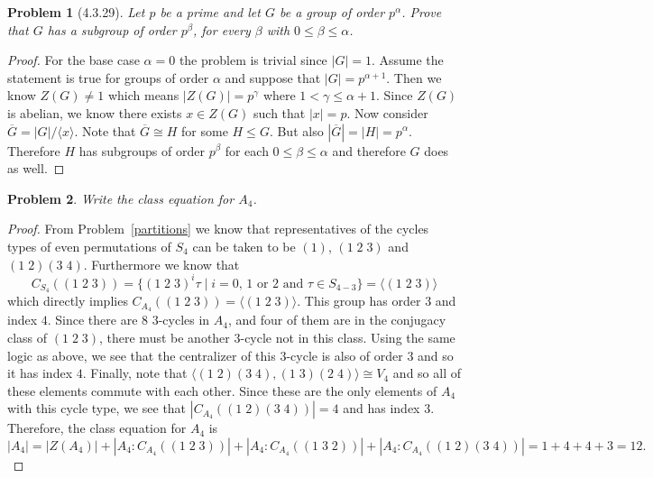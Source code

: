 \documentclass{article}
\newtheorem{problem}{Problem}
\begin{document}
\begin{problem}[4.3.29]
Let $p$ be a prime and let $G$ be a group of order $p^{\alpha}$. Prove that $G$ has a subgroup of order $p^{\beta}$, for every $\beta$ with $0 \leq \beta \leq \alpha$.
\end{problem}
\begin{proof}
For the base case $\alpha = 0$ the problem is trivial since $|G| = 1$. Assume the statement is true for groups of order $\alpha$ and suppose that $|G| = p^{\alpha + 1}$. Then we know $Z(G) \neq 1$ which means $|Z(G)| = p^{\gamma}$ where $1 < \gamma \leq \alpha + 1$. Since $Z(G)$ is abelian, we know there exists $x \in Z(G)$ such that $|x| = p$. Now consider $\overline{G} = |G|/\langle x \rangle$. Note that $\overline{G} \cong H$ for some $H \leq G$. But also $|\overline{G}| = |H| = p^{\alpha}$. Therefore $H$ has subgroups of order $p^{\beta}$ for each $0 \leq \beta \leq \alpha$ and therefore $G$ does as well.
\end{proof}

\begin{problem}
Write the class equation for $A_4$.
\end{problem}
\begin{proof}
From Problem~\ref{partitions} we know that representatives of the cycles types of even permutations of $S_4$ can be taken to be $(1)$, $(1 \; 2 \; 3)$ and $(1 \; 2)(3 \; 4)$. Furthermore we know that
\[
C_{S_4}((1 \; 2 \; 3)) = \{(1 \; 2 \; 3)^{i} \tau \mid \text{$i = 0$, $1$ or $2$ and $\tau \in S_{4-3}$}\} = \langle (1 \; 2 \; 3) \rangle
\]
which directly implies $C_{A_4}((1 \; 2 \; 3)) = \langle (1 \; 2 \; 3) \rangle$. This group has order $3$ and index $4$. Since there are $8$ $3$-cycles in $A_4$, and four of them are in the conjugacy class of $(1 \; 2 \; 3)$, there must be another $3$-cycle not in this class. Using the same logic as above, we see that the centralizer of this $3$-cycle is also of order $3$ and so it has index $4$. Finally, note that $\langle (1 \; 2)(3 \; 4), (1 \; 3)(2 \; 4) \rangle \cong V_4$ and so all of these elements commute with each other. Since these are the only elements of $A_4$ with this cycle type, we see that $|C_{A_4}((1 \; 2)(3 \; 4))| = 4$ and has index $3$. Therefore, the class equation for $A_4$ is
\[
|A_4| = |Z(A_4)| + |A_4 : C_{A_4} ((1 \; 2 \; 3))| + |A_4 : C_{A_4} ((1 \; 3 \; 2))| + |A_4 : C_{A_4}((1 \; 2)(3 \; 4))| = 1 + 4 + 4 + 3 = 12.
\]
\end{proof}
\end{document}
